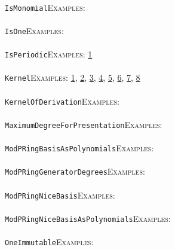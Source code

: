 \documentclass[a4paper,11pt]{report}
\begin{document}
{{ \\
 \texttt{IsMonomial}{\nobreakspace}{\nobreakspace}{\nobreakspace}{\nobreakspace}\textsc{Examples:} \\
 \\
 \texttt{IsOne}{\nobreakspace}{\nobreakspace}{\nobreakspace}{\nobreakspace}\textsc{Examples:} \\
 \\
 \texttt{IsPeriodic}{\nobreakspace}{\nobreakspace}{\nobreakspace}{\nobreakspace}\textsc{Examples:} \href{tutorial/chap10.html} {1}{\nobreakspace} \\
 \\
 \texttt{Kernel}{\nobreakspace}{\nobreakspace}{\nobreakspace}{\nobreakspace}\textsc{Examples:} \href{tutorial/chap10.html} {1}{\nobreakspace}, \href{../www/SideLinks/About/aboutCoefficientSequence.html} {2}{\nobreakspace}, \href{../www/SideLinks/About/aboutCohomologyRings.html} {3}{\nobreakspace}, \href{../www/SideLinks/About/aboutCrossedMods.html} {4}{\nobreakspace}, \href{../www/SideLinks/About/aboutDefinitions.html} {5}{\nobreakspace}, \href{../www/SideLinks/About/aboutSpaceGroup.html} {6}{\nobreakspace}, \href{../www/SideLinks/About/aboutIntro.html} {7}{\nobreakspace}, \href{../www/SideLinks/About/aboutTensorSquare.html} {8}{\nobreakspace} \\
 \\
 \texttt{KernelOfDerivation}{\nobreakspace}{\nobreakspace}{\nobreakspace}{\nobreakspace}\textsc{Examples:} \\
 \\
 \texttt{MaximumDegreeForPresentation}{\nobreakspace}{\nobreakspace}{\nobreakspace}{\nobreakspace}\textsc{Examples:} \\
 \\
 \texttt{ModPRingBasisAsPolynomials}{\nobreakspace}{\nobreakspace}{\nobreakspace}{\nobreakspace}\textsc{Examples:} \\
 \\
 \texttt{ModPRingGeneratorDegrees}{\nobreakspace}{\nobreakspace}{\nobreakspace}{\nobreakspace}\textsc{Examples:} \\
 \\
 \texttt{ModPRingNiceBasis}{\nobreakspace}{\nobreakspace}{\nobreakspace}{\nobreakspace}\textsc{Examples:} \\
 \\
 \texttt{ModPRingNiceBasisAsPolynomials}{\nobreakspace}{\nobreakspace}{\nobreakspace}{\nobreakspace}\textsc{Examples:} \\
 \\
 \texttt{OneImmutable}{\nobreakspace}{\nobreakspace}{\nobreakspace}{\nobreakspace}\textsc{Examples:} \\
}}
\end{document}

